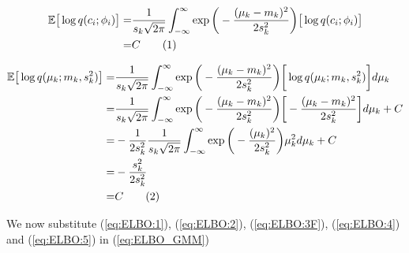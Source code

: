 \documentclass[]{article}
\newcommand{\Expectation} {\mathbb{E}}
\newcommand\numberthis    {\addtocounter{equation}{1}\tag{\theequation}}
\begin{document}
\begin{align*}
	\Expectation\big[\log{q(c_i;\phi_i)}\big] =& \frac{1}{s_k\sqrt{2\pi}} \int_{-\infty}^{\infty} \exp{\bigg(- \frac{(\mu_k-m_k)^2}{2 s_k^2}\bigg)}\big[\log{q(c_i;\phi_i)}\big]\\
	=& C \numberthis \label{eq:ELBO:4}
\end{align*}

\begin{align*}
 	\Expectation \big[\log{q(\mu_k;m_k,s^2_k)}\big] =& \frac{1}{s_k\sqrt{2\pi}} \int_{-\infty}^{\infty} \exp{\bigg(- \frac{(\mu_k-m_k)^2}{2 s_k^2}\bigg)} \bigg[\log{q(\mu_k;m_k,s^2_k)} \bigg] d\mu_k \\
 	 =& \frac{1}{s_k\sqrt{2\pi}} \int_{-\infty}^{\infty} \exp{\bigg(- \frac{(\mu_k-m_k)^2}{2 s_k^2}\bigg)} \bigg[- \frac{(\mu_k-m_k)^2}{2 s_k^2}\bigg] d\mu_k + C\\
 	  =& - \frac{1 }{2 s_k^2} \frac{1}{ s_k\sqrt{2\pi}} \int_{-\infty}^{\infty} \exp{\bigg(- \frac{(\mu_k)^2}{2 s_k^2}\bigg)} \mu_k^2 d\mu_k + C\\
 	=& - \frac{s_k^2 }{2 s_k^2} \\
 	=& C \numberthis \label{eq:ELBO:5}
\end{align*}

We now substitute (\ref{eq:ELBO:1}), (\ref{eq:ELBO:2}), (\ref{eq:ELBO:3F}), (\ref{eq:ELBO:4}) and (\ref{eq:ELBO:5}) in (\ref{eq:ELBO_GMM}) 
\printglossaries




\end{document}
